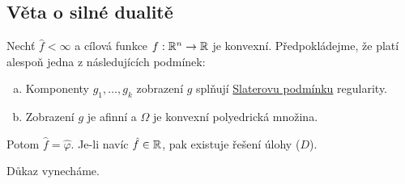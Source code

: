 \subsection{Věta o silné dualitě}\label{silDual}
Nechť $\hat f < \infty$ a cílová funkce $f : \mathbb{R}^n \rightarrow \mathbb{R}$ je konvexní. Předpokládejme, že platí alespoň jedna z 
následujících podmínek:
\begin{enumerate}[(a)]
    \item Komponenty $g_1, \dots, g_k$ zobrazení $g$ splňují \hyperref[slaterPodm]{Slaterovu podmínku} regularity.
    \item Zobrazení $g$ je afinní a $\Omega$ je konvexní polyedrická množina.
\end{enumerate}
Potom $\hat f = \hat \varphi$. Je-li navíc $\hat f \in \mathbb{R}$, pak existuje řešení úlohy ($D$).

Důkaz vynecháme.